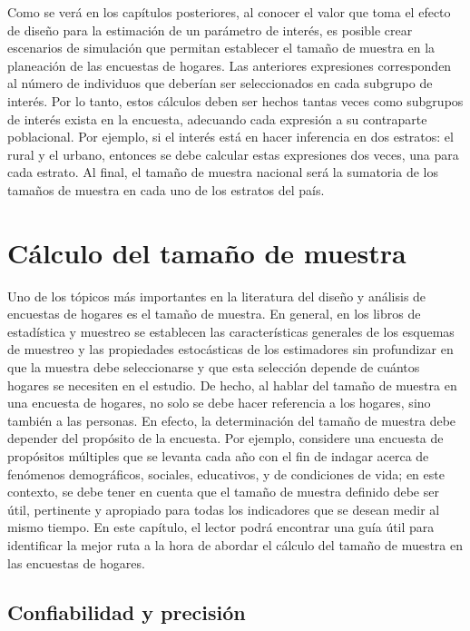 \documentclass[
  10pt,
  spanish,
]{book}
\begin{document}
Como se verá en los capítulos posteriores, al conocer el valor que toma el efecto de diseño para la estimación de un parámetro de interés, es posible crear escenarios de simulación que permitan establecer el tamaño de muestra en la planeación de las encuestas de hogares. Las anteriores expresiones corresponden al número de individuos que deberían ser seleccionados en cada subgrupo de interés. Por lo tanto, estos cálculos deben ser hechos tantas veces como subgrupos de interés exista en la encuesta, adecuando cada expresión a su contraparte poblacional. Por ejemplo, si el interés está en hacer inferencia en dos estratos: el rural y el urbano, entonces se debe calcular estas expresiones dos veces, una para cada estrato. Al final, el tamaño de muestra nacional será la sumatoria de los tamaños de muestra en cada uno de los estratos del país.

\hypertarget{cuxe1lculo-del-tamauxf1o-de-muestra}{%
\chapter{Cálculo del tamaño de muestra}\label{cuxe1lculo-del-tamauxf1o-de-muestra}}

Uno de los tópicos más importantes en la literatura del diseño y análisis de encuestas de hogares es el tamaño de muestra. En general, en los libros de estadística y muestreo se establecen las características generales de los esquemas de muestreo y las propiedades estocásticas de los estimadores sin profundizar en que la muestra debe seleccionarse y que esta selección depende de cuántos hogares se necesiten en el estudio. De hecho, al hablar del tamaño de muestra en una encuesta de hogares, no solo se debe hacer referencia a los hogares, sino también a las personas. En efecto, la determinación del tamaño de muestra debe depender del propósito de la encuesta. Por ejemplo, considere una encuesta de propósitos múltiples que se levanta cada año con el fin de indagar acerca de fenómenos demográficos, sociales, educativos, y de condiciones de vida; en este contexto, se debe tener en cuenta que el tamaño de muestra definido debe ser útil, pertinente y apropiado para todas los indicadores que se desean medir al mismo tiempo. En este capítulo, el lector podrá encontrar una guía útil para identificar la mejor ruta a la hora de abordar el cálculo del tamaño de muestra en las encuestas de hogares.

\hypertarget{confiabilidad-y-precisiuxf3n}{%
\section{Confiabilidad y precisión}\label{confiabilidad-y-precisiuxf3n}}
\end{document}
